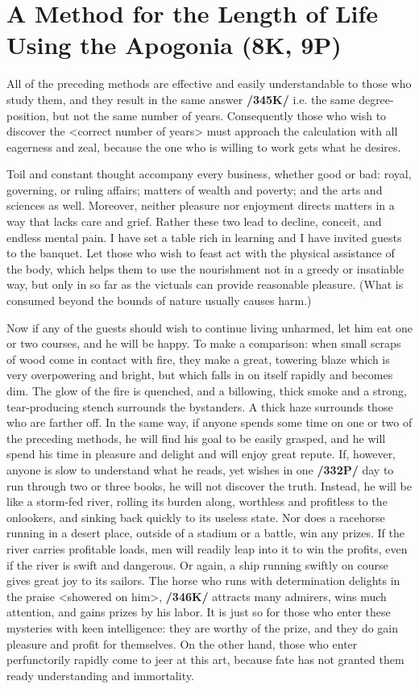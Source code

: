 \section{A Method for the Length of Life Using the Apogonia (8K, 9P)}

All of the preceding methods are effective and easily understandable to those who study them, and they result in the same answer \textbf{/345K/} i.e. the same degree-position, but not the same number of years. Consequently those who wish to discover the <correct number of years> must approach the calculation with all eagerness and zeal, because the one who is willing to work gets what he desires. 

Toil and constant thought accompany every business, whether good or bad: royal, governing, or ruling affairs; matters of wealth and poverty; and the arts and sciences as well. Moreover, neither pleasure nor enjoyment directs matters in a way that lacks care and grief. Rather these two lead to decline, conceit, and endless mental pain. I have set a table rich in learning and I have invited guests to the banquet. Let those who wish to feast act with the physical assistance of the body, which helps them to use the nourishment not in a greedy or insatiable way, but only in so far as the victuals can provide reasonable pleasure. (What is consumed beyond the bounds of nature usually causes harm.) 

Now if any of the guests should wish to continue living unharmed, let him eat one or two courses, and he will be happy. To make a comparison: when small scraps of wood come in contact with fire, they make a great, towering blaze which is very overpowering and bright, but which falls in on itself rapidly and becomes dim. The glow of the fire is quenched, and a billowing, thick smoke and a strong, tear-producing stench surrounds the bystanders. A thick haze surrounds those who are farther off. In the same way, if anyone spends some time on one or two of the preceding methods, he will find his goal to be easily grasped, and he will spend his time in pleasure and delight and will enjoy great repute. If, however, anyone is slow to understand what he reads, yet wishes in one \textbf{/332P/} day to run through two or three books, he will not discover the truth. Instead, he will be like a storm-fed river, rolling its burden along, worthless and profitless to the onlookers, and sinking back quickly to its useless state. Nor does a racehorse running in a desert place, outside of a stadium or a battle, win any prizes. If the river carries profitable loads, men will readily leap into it to win the profits, even if the river is swift and dangerous. Or again, a ship running swiftly on course gives great joy to its sailors. The horse who runs with determination delights in the praise <showered on him>, \textbf{/346K/} attracts many admirers, wins much attention, and gains prizes by his labor. It is just so for those who enter these mysteries with keen intelligence: they are worthy of the prize, and they do gain pleasure and profit for themselves. On the other hand, those who enter perfunctorily rapidly come to jeer at this art, because fate has not granted them ready understanding and immortality. 

